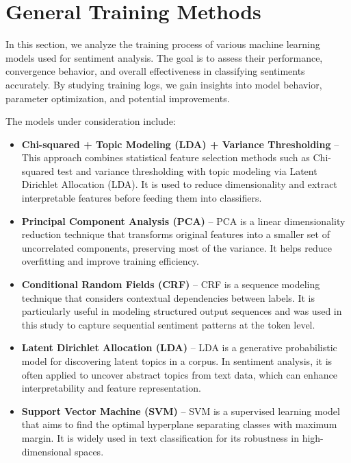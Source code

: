 \section{General Training Methods}

In this section, we analyze the training process of various machine learning models used for sentiment analysis. The goal is to assess their performance, convergence behavior, and overall effectiveness in classifying sentiments accurately. By studying training logs, we gain insights into model behavior, parameter optimization, and potential improvements.

The models under consideration include:

\begin{itemize}
    \item \textbf{Chi-squared + Topic Modeling (LDA) + Variance Thresholding} – This approach combines statistical feature selection methods such as Chi-squared test and variance thresholding with topic modeling via Latent Dirichlet Allocation (LDA). It is used to reduce dimensionality and extract interpretable features before feeding them into classifiers.
    
    \item \textbf{Principal Component Analysis (PCA)} – PCA is a linear dimensionality reduction technique that transforms original features into a smaller set of uncorrelated components, preserving most of the variance. It helps reduce overfitting and improve training efficiency.
    
    \item \textbf{Conditional Random Fields (CRF)} – CRF is a sequence modeling technique that considers contextual dependencies between labels. It is particularly useful in modeling structured output sequences and was used in this study to capture sequential sentiment patterns at the token level.
    
    \item \textbf{Latent Dirichlet Allocation (LDA)} – LDA is a generative probabilistic model for discovering latent topics in a corpus. In sentiment analysis, it is often applied to uncover abstract topics from text data, which can enhance interpretability and feature representation.
    
    \item \textbf{Support Vector Machine (SVM)} – SVM is a supervised learning model that aims to find the optimal hyperplane separating classes with maximum margin. It is widely used in text classification for its robustness in high-dimensional spaces.
    

\end{itemize}
